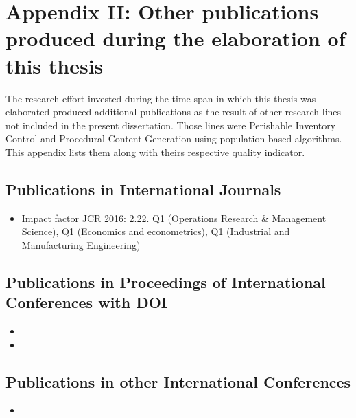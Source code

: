 

\chapter*{Appendix II: Other publications produced during the elaboration of this thesis}
\label{AppendixB}

The research effort invested during the time span in which this thesis was elaborated
produced additional publications as the result of other research lines
not included in the present dissertation. Those lines were Perishable Inventory Control and Procedural Content Generation using population based algorithms. This appendix
lists them along with theirs respective quality indicator.


\section*{Publications in International Journals}
\begin{itemize}
\item [\cite{PaulsWorm2015}] 

Impact factor JCR 2016: 2.22. Q1 (Operations Research \& Management Science), Q1 (Economics and econometrics), Q1 (Industrial and Manufacturing 
Engineering)

\end{itemize}

\section*{Publications in Proceedings of International Conferences with DOI}
\begin{itemize}
\item [\cite{Lara-Cabrera2016}] 
\item [\cite{Hendrix2015}] 
\end{itemize}

\section*{Publications in other International Conferences}
\begin{itemize}
	\item [\cite{PaulsWormISIR2014}] 
\end{itemize}



